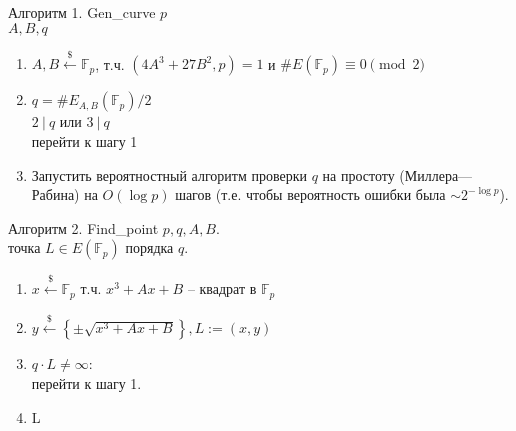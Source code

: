 \documentclass{beamer}
\begin{document}
\begin{frame}{Алгоритм 1. Gen\_curve}
     $p$\\
     $A,B,q$
    \begin{enumerate}
        \item $A, B \xleftarrow{\$} \mathbb{F}_p$, т.ч. $(4A^3 + 27B^2, p) = 1$ и $\#E(\mathbb{F}_p) \equiv 0 \pmod{2}$
        \item $q = \#E_{A,B}(\mathbb{F}_p) / 2$\\
         {$2\ |\ q$ или $3\ |\ q$}\\
        \quad перейти к шагу 1  
        \item Запустить вероятностный алгоритм проверки $q$ на простоту (Миллера—Рабина) на $O(\log p)$ шагов (т.е. чтобы вероятность ошибки была $\sim 2^{-\log p}$).
    \end{enumerate}
\end{frame}

\begin{frame}{Алгоритм 2. Find\_point}
     $p, q, A, B$.\\
     точка $L \in E(\mathbb{F}_p)$ порядка $q$.
    \begin{enumerate}
        \item $x \xleftarrow{\$} \mathbb{F}_p$ т.ч. $x^3+Ax+B$ -- квадрат в $\mathbb{F}_p$
        \item $y \xleftarrow{\$} \left\{ \pm \sqrt{x^3 + Ax+B} \right\}, L:=(x,y)$
        \item {} {$q \cdot L \neq \infty$}:\\
        \quad перейти к шагу 1.
        \item {} L
    \end{enumerate}
\end{frame}
\end{document}
